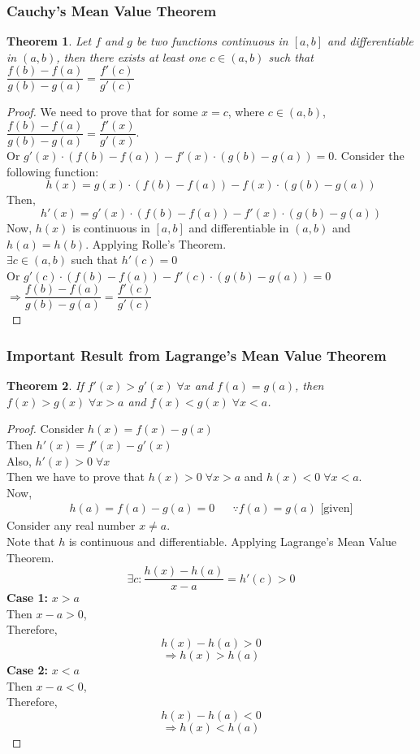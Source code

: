 \documentclass[14]{article}
\newtheorem{theorem}{Theorem}
\theoremstyle{definition}
\begin{document}
\subsubsection{Cauchy's Mean Value Theorem}
\begin{theorem}
Let $f$ and $g$ be two functions continuous in $[a, b]$ and differentiable in $(a, b)$, then there exists at least one $c \in (a, b)$ such that $\dfrac{f(b) - f(a)}{g(b) - g(a)} = \dfrac{f'(c)}{g'(c)}$
\end{theorem}
\begin{proof}
We need to prove that for some $x = c$, where $c \in (a, b)$, $\dfrac{f(b) - f(a)}{g(b) - g(a)} = \dfrac{f'(x)}{g'(x)}$.\\
Or $g'(x) \cdot \left( f(b) - f(a) \right) - f'(x) \cdot \left( g(b) - g(a) \right) = 0$.
Consider the following function:
\[h(x) = g(x) \cdot \left( f(b) - f(a) \right) - f(x) \cdot \left( g(b) - g(a) \right)\]
Then,
\[h'(x) = g'(x) \cdot \left( f(b) - f(a) \right) - f'(x) \cdot \left( g(b) - g(a) \right)\]
Now, $h(x)$ is  continuous in $[a, b]$ and differentiable in $(a, b)$ and $h(a) = h(b)$. Applying Rolle's Theorem.\\
$\exists c \in (a, b)$ such that $h'(c) = 0$\\
Or $g'(c) \cdot \left( f(b) - f(a) \right) - f'(c) \cdot \left( g(b) - g(a) \right) = 0$\\
$\Rightarrow \dfrac{f(b) - f(a)}{g(b) - g(a)} = \dfrac{f'(c)}{g'(c)}$\\
\end{proof}
\pagebreak
\subsubsection{Important Result from Lagrange's Mean Value Theorem}
\begin{theorem}
If $f'(x) > g'(x) \; \forall x$ and $f(a) = g(a)$, then $f(x) > g(x) \; \forall x > a$ and $f(x) < g(x) \; \forall x < a$.
\end{theorem}
\begin{proof}
Consider $h(x) = f(x) - g(x)$\\
Then $h'(x) = f'(x) - g'(x)$\\
Also, $h'(x) > 0 \; \forall x$\\
Then we have to prove that $h(x) > 0 \; \forall x > a$ and $h(x) < 0 \; \forall x < a$.\\
Now,
\begin{align*}
h(a) = f(a) - g(a) = 0 && \because f(a) = g(a) \text{ [given]}
\end{align*}
Consider any real number $x \neq a$.\\
Note that $h$ is continuous and differentiable. Applying Lagrange's Mean Value Theorem.
\[\exists c : \dfrac{h(x) - h(a)}{x - a} = h'(c) > 0\]
\textbf{Case 1:} $x > a$\\
Then $x - a > 0$,\\
Therefore,\\
\[h(x) - h(a) > 0\]
\[\Rightarrow h(x) > h(a)\]
\textbf{Case 2:} $x < a$\\
Then $x - a < 0$,\\
Therefore,\\
\[h(x) - h(a) < 0\]
\[\Rightarrow h(x) < h(a)\]
\end{proof}
\pagebreak
\end{document}
